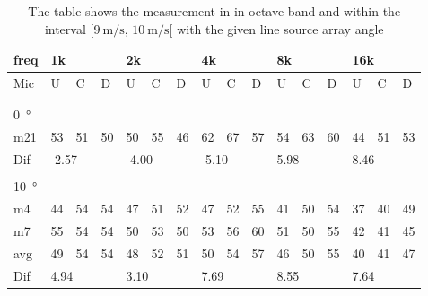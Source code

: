 \begin{table}[H]
\centering
\caption{The table shows the measurement in in octave band and within the interval $[\SI{9}{\meter\per\second},\, \SI{10}{\meter\per\second}[ $ with the given line source array angle}
\begin{tabular}{l|l|l|l|l|l|l|l|l|l|l|l|l|lll}
freq & \multicolumn{3}{l|}{1k} & \multicolumn{3}{l|}{2k} & \multicolumn{3}{l|}{4k} & \multicolumn{3}{l|}{8k} & \multicolumn{3}{l}{16k}                                \\ \hline
Mic  & U      & C      & D     & U      & C      & D     & U      & C      & D     & U      & C      & D     & \multicolumn{1}{l|}{U}  & \multicolumn{1}{l|}{C}  & D  \\ \hline
 & \multicolumn{3}{l|}{} & \multicolumn{3}{l|}{} & \multicolumn{3}{l|}{} & \multicolumn{3}{l|}{} & \multicolumn{3}{l}{}                                \\ 
 \multicolumn{16}{l}{ } \\   
\SI{0}{\degree}   & \multicolumn{3}{l|}{} & \multicolumn{3}{l|}{} & \multicolumn{3}{l|}{} & \multicolumn{3}{l|}{} & \multicolumn{3}{l}{}   \\  \hline
m21  & 53     & 51     & 50    & 50     & 55     & 46    & 62     & 67     & 57    & 54     & 63     & 60    & \multicolumn{1}{l|}{44} & \multicolumn{1}{l|}{51} & 53 \\ \hline 
Dif & \multicolumn{3}{l|}{-2.57} & \multicolumn{3}{l|}{-4.00} & \multicolumn{3}{l|}{-5.10} & \multicolumn{3}{l|}{5.98} & \multicolumn{3}{l}{8.46}  \\ 
 \multicolumn{16}{l}{ } \\                             
\SI{10}{\degree}   & \multicolumn{3}{l|}{} & \multicolumn{3}{l|}{} & \multicolumn{3}{l|}{} & \multicolumn{3}{l|}{} & \multicolumn{3}{l}{}   \\  \hline
m4    & 44     & 54     &  54    &  47    &  51    &   52   &  47    &  52     &  55    &  41     & 50     &  54    & \multicolumn{1}{l|}{37} & \multicolumn{1}{l|}{40} & 49 \\
m7    & 55     & 54     &  54    &   50   &   53   &  50    &  53    &  56     &  60    &  51     & 50     & 55     & \multicolumn{1}{l|}{42} & \multicolumn{1}{l|}{41} & 45 \\ \hline
avg &  49    &  54    & 54     &  48    &  52    & 51     & 50     &   54    &   57   &  46     & 50     &  55    & \multicolumn{1}{l|}{40} & \multicolumn{1}{l|}{41}  & 47  \\ \hline  
Dif & \multicolumn{3}{l|}{4.94} & \multicolumn{3}{l|}{3.10} & \multicolumn{3}{l|}{7.69} & \multicolumn{3}{l|}{8.55} & \multicolumn{3}{l}{7.64} \\ 

\end{tabular}
\end{table}
